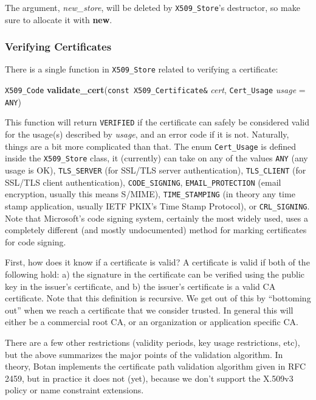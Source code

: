 \documentclass{article}
\newcommand{\function}[1]{\textbf{#1}}
\newcommand{\type}[1]{\texttt{#1}}
\renewcommand{\arg}[1]{\textsl{#1}}
\begin{document}
The argument, \arg{new\_store}, will be deleted by \type{X509\_Store}'s
destructor, so make sure to allocate it with \function{new}.

\subsubsection{Verifying Certificates}

There is a single function in \type{X509\_Store} related to verifying a
certificate:

\type{X509\_Code}
\function{validate\_cert}(\type{const X509\_Certificate\&} \arg{cert},
                          \type{Cert\_Usage} \arg{usage} = \type{ANY})

This function will return \type{VERIFIED} if the certificate can
safely be considered valid for the usage(s) described by \arg{usage},
and an error code if it is not. Naturally, things are a bit more
complicated than that. The enum \type{Cert\_Usage} is defined inside
the \type{X509\_Store} class, it (currently) can take on any of the
values \type{ANY} (any usage is OK), \type{TLS\_SERVER} (for SSL/TLS
server authentication), \type{TLS\_CLIENT} (for SSL/TLS client
authentication), \type{CODE\_SIGNING}, \type{EMAIL\_PROTECTION} (email
encryption, usually this means S/MIME), \type{TIME\_STAMPING} (in
theory any time stamp application, usually IETF PKIX's Time Stamp
Protocol), or \type{CRL\_SIGNING}. Note that Microsoft's code signing
system, certainly the most widely used, uses a completely different
(and mostly undocumented) method for marking certificates for code
signing.

First, how does it know if a certificate is valid? A certificate is
valid if both of the following hold: a) the signature in the
certificate can be verified using the public key in the issuer's
certificate, and b) the issuer's certificate is a valid CA
certificate. Note that this definition is recursive. We get out of
this by ``bottoming out'' when we reach a certificate that we consider
trusted. In general this will either be a commercial root CA, or an
organization or application specific CA.

There are a few other restrictions (validity periods, key usage
restrictions, etc), but the above summarizes the major points of the
validation algorithm. In theory, Botan implements the certificate path
validation algorithm given in RFC 2459, but in practice it does not
(yet), because we don't support the X.509v3 policy or name constraint
extensions.
\end{document}
